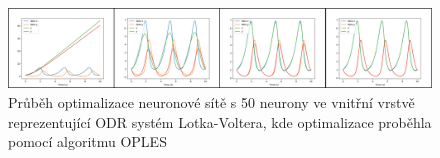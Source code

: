 \begin{figure}[h]
\begin{center}
  \includegraphics[width=\textwidth]{figures/LotkaVoltera_NN_OPLES}
\end{center}
\caption{Průběh optimalizace neuronové sítě s 50 neurony ve vnitřní vrstvě
reprezentující ODR systém Lotka-Voltera, kde optimalizace proběhla pomocí
algoritmu OPLES}
\label{fig:lotka_voltera_oples}
\end{figure}

